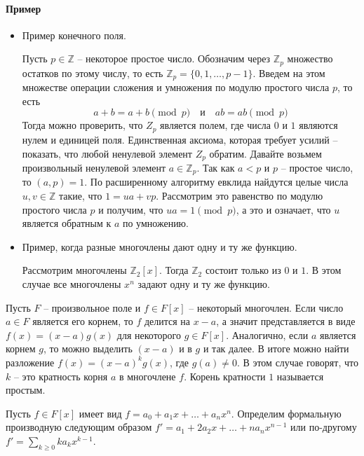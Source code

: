 \paragraph{Пример}
\begin{itemize}
\item Пример конечного поля.

Пусть $p\in \mathbb Z$ -- некоторое простое число.
Обозначим через $\mathbb Z_p$ множество остатков по этому числу, то есть $\mathbb Z_p = \{0, 1, \ldots, p-1\}$.
Введем на этом множестве операции сложения и умножения по модулю простого числа $p$, то есть
\[
a + b = a + b\pmod p\quad \text{и}\quad a b = ab \pmod p
\]
Тогда можно проверить, что $Z_p$ является полем, где числа $0$ и $1$ являются нулем и единицей поля.
Единственная аксиома, которая требует усилий -- показать, что любой ненулевой элемент $Z_p$ обратим.
Давайте возьмем произвольный ненулевой элемент $a\in \mathbb Z_p$.
Так как $ a < p$ и $p$ -- простое число, то $(a, p) =1$.
По расширенному алгоритму евклида найдутся целые числа $u, v\in\mathbb Z$ такие, что $1 = u a + vp$.
Рассмотрим это равенство по модулю простого числа $p$ и получим, что
$u a = 1 \pmod p$, а это и означает, что $u$ является обратным к $a$ по умножению.

\item Пример, когда разные многочлены дают одну и ту же функцию.

Рассмотрим многочлены $\mathbb Z_2[x]$.
Тогда $\mathbb Z_2$ состоит только из $0$ и $1$.
В этом случае все многочлены $x^n$ задают одну и ту же функцию.
\end{itemize}

\begin{definition}
 Пусть $F$ -- произвольное поле и $f\in F[x]$ -- некоторый многочлен.
 Если число $a\in F$ является его корнем, то $f$ делится на $x - a$, а значит представляется в виде $f(x) = (x - a) g(x)$ для некоторого $g\in F[x]$.
 Аналогично, если $a$ является корнем $g$, то можно выделить $(x - a)$ и в $g$ и так далее.
 В итоге можно найти разложение $f(x) = (x - a)^k g(x)$, где $g(a) \neq 0$.
 В этом случае говорят, что $k$ -- это кратность корня $a$ в многочлене $f$.
 Корень кратности $1$ называется простым.
\end{definition}


\begin{definition}
Пусть $f\in F[x]$ имеет вид $f = a_0 + a_1 x + \ldots + a_n x^n$.
Определим формальную производную следующим образом $f' = a_1 + 2a_2 x+\ldots + na_n x^{n-1}$ или по-другому $f'=\sum_{k\geqslant 0} k a_k x^{k-1}$.
\end{definition}

